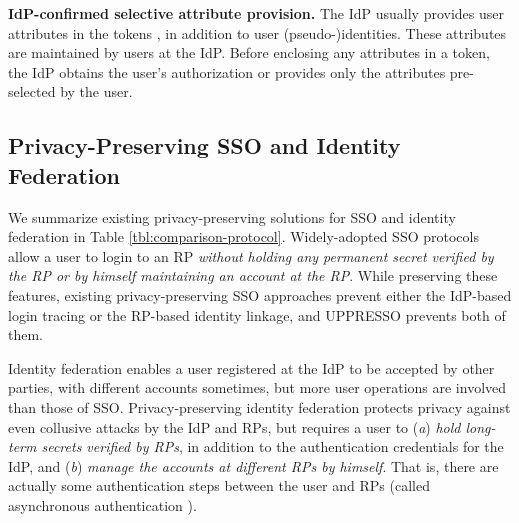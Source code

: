 \noindent\textbf{IdP-confirmed selective attribute provision.}
The IdP usually provides user attributes in the tokens \cite{OpenIDConnect,rfc6749}, in addition to user (pseudo-)identities.
These attributes are maintained by users at the IdP.
Before enclosing any attributes in a token, the IdP obtains the user's authorization or provides only the attributes pre-selected by the user.

%



\subsection{Privacy-Preserving SSO and Identity Federation}
\label{subsec-solutions}

We summarize existing privacy-preserving solutions for SSO and identity federation in Table \ref{tbl:comparison-protocol}.
Widely-adopted SSO protocols \cite{OpenIDConnect,rfc6749,SAML,SAMLIdentifier} allow a user to login to an RP
\emph{without holding any permanent secret verified by the RP or by himself maintaining an account at the RP}.
While preserving these features, existing privacy-preserving SSO approaches \cite{BrowserID,SPRESSO,NIST2017draft} prevent either the IdP-based login tracing or the RP-based identity linkage, and UPPRESSO prevents both of them.

Identity federation enables a user registered at the IdP to be accepted by other parties,
            with different accounts sometimes,
        but more user operations are involved than those of SSO.
Privacy-preserving identity federation 
    protects privacy against even collusive attacks by the IdP and RPs,
    but requires a user \cite{ELPASSO,UnlimitID,hyperledge-idemix,PseudoID,Opaak,uprov} to (\emph{a}) \emph{hold long-term secrets verified by RPs},
            in addition to the authentication credentials for the IdP,
                and (\emph{b}) \emph{manage the accounts at different RPs by himself}.
That is, there are actually some authentication steps between the user and RPs (called asynchronous authentication \cite{ELPASSO}).

